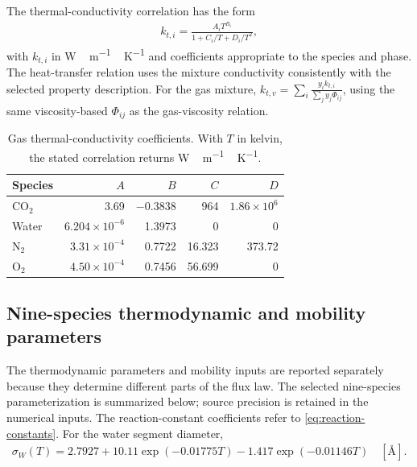 The thermal-conductivity correlation has the form
\begin{align}
k_{t,i}=\frac{A_iT^{B_i}}{1+C_i/T+D_i/T^2},
\end{align}
with $k_{t,i}$ in \unit{W\,m^{-1}\,K^{-1}} and coefficients appropriate to the species and phase.
The heat-transfer relation uses the mixture conductivity consistently with the selected property description.
For the gas mixture, $k_{t,v}=\sum_i\frac{y_i k_{t,i}}{\sum_j y_j\Phi_{ij}}$, using the same viscosity-based $\Phi_{ij}$ as the gas-viscosity relation.

\begin{table}[pos=htbp]
\centering\small
\caption{Gas thermal-conductivity coefficients. With $T$ in kelvin, the stated correlation returns \unit{W\,m^{-1}\,K^{-1}}.}
\label{tab:gas-conductivity-coefficients}
\begin{tabular}{@{}lrrrr@{}}
\toprule
Species & $A$ & $B$ & $C$ & $D$\\
\midrule
CO$_2$ & 3.69 & $-0.3838$ & 964 & $1.86\times10^6$\\
Water & $6.204\times10^{-6}$ & 1.3973 & 0 & 0\\
N$_2$ & $3.31\times10^{-4}$ & 0.7722 & 16.323 & 373.72\\
O$_2$ & $4.50\times10^{-4}$ & 0.7456 & 56.699 & 0\\
\bottomrule
\end{tabular}
\end{table}

\subsection{Nine-species thermodynamic and mobility parameters}
The thermodynamic parameters and mobility inputs are reported separately because they determine different parts of the flux law.
The selected nine-species parameterization is summarized below; source precision is retained in the numerical inputs.
The reaction-constant coefficients refer to \cref{eq:reaction-constants}.
For the water segment diameter,
\begin{align}
\sigma_W(T)=2.7927+10.11\exp(-0.01775T)-1.417\exp(-0.01146T)
\quad[\text{\AA}].
\end{align}


